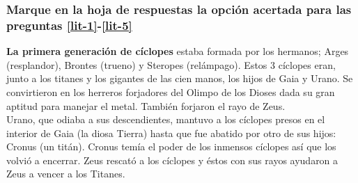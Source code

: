 

\subsubsection*{Marque en la hoja de respuestas la opción acertada para las preguntas \ref{lit-1}-\ref{lit-5}}

\textbf{La primera generación de cíclopes} estaba formada por los hermanos; Arges (resplandor), Brontes (trueno) y Steropes (relámpago). Estos 3 cíclopes eran, junto a los titanes y los gigantes de las cien manos, los hijos de Gaia y Urano. Se convirtieron en los herreros forjadores del Olimpo de los Dioses dada su gran aptitud para manejar el metal. También forjaron el rayo de Zeus.\\

Urano, que odiaba a sus descendientes, mantuvo a los cíclopes presos en el interior de Gaia (la diosa Tierra) hasta que fue abatido por otro de sus hijos: Cronus (un titán). Cronus temía el poder de los inmensos cíclopes así que los volvió a encerrar. Zeus rescató a los cíclopes y éstos con sus rayos ayudaron a Zeus a vencer a los Titanes.\\

